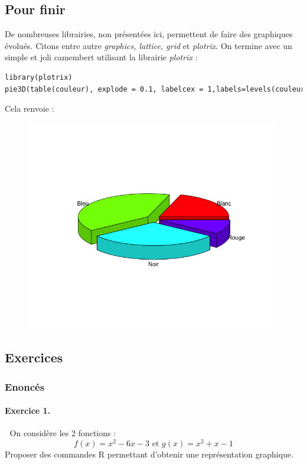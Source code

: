 \subsection{Pour finir}
De nombreuses librairies, non présentées ici, permettent de faire des graphiques évolués. Citons entre autre \textit{graphics, lattice, grid} et \textit{plotrix}.\newline
On termine avec un simple et joli camembert utilisant la librairie \textit{plotrix} :
\begin{lstlisting}[language=html]
library(plotrix)
pie3D(table(couleur), explode = 0.1, labelcex = 1,labels=levels(couleur))
\end{lstlisting}
Cela renvoie :
\begin{figure}[H]\begin{center}\includegraphics[scale=0.4]{ilu/gra76.png}\end{center}\end{figure}
\subsection{Exercices}
\subsubsection{Enoncés}
\paragraph{Exercice 1. }\textcolor{white}{.}\newline
On considère les 2 fonctions :
$$f(x)=x^{2} -6x -3 \textrm{ et } g(x) = x^{2} + x - 1$$
Proposer des commandes R permettant d'obtenir une représentation graphique.
